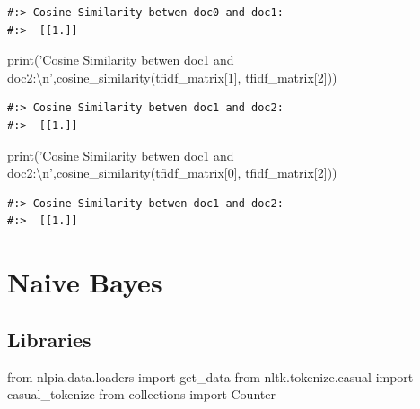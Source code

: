 \documentclass[
]{book}
\newenvironment{Shaded}{\begin{snugshade}}{\end{snugshade}}
\newcommand{\BuiltInTok}[1]{#1}
\newcommand{\CharTok}[1]{\textcolor[rgb]{0.5,0.5,0.5}{#1}}
\newcommand{\DecValTok}[1]{\textcolor[rgb]{0.06,0.06,0.06}{#1}}
\newcommand{\ImportTok}[1]{#1}
\newcommand{\NormalTok}[1]{#1}
\newcommand{\StringTok}[1]{\textcolor[rgb]{0.5,0.5,0.5}{#1}}
\begin{document}
\begin{verbatim}
#:> Cosine Similarity betwen doc0 and doc1:
#:>  [[1.]]
\end{verbatim}

\begin{Shaded}
\begin{Highlighting}[]
\BuiltInTok{print}\NormalTok{(}\StringTok{'Cosine Similarity betwen doc1 and doc2:}\CharTok{\textbackslash{}n}\StringTok{'}\NormalTok{,cosine_similarity(tfidf_matrix[}\DecValTok{1}\NormalTok{], tfidf_matrix[}\DecValTok{2}\NormalTok{]))}
\end{Highlighting}
\end{Shaded}

\begin{verbatim}
#:> Cosine Similarity betwen doc1 and doc2:
#:>  [[1.]]
\end{verbatim}

\begin{Shaded}
\begin{Highlighting}[]
\BuiltInTok{print}\NormalTok{(}\StringTok{'Cosine Similarity betwen doc1 and doc2:}\CharTok{\textbackslash{}n}\StringTok{'}\NormalTok{,cosine_similarity(tfidf_matrix[}\DecValTok{0}\NormalTok{], tfidf_matrix[}\DecValTok{2}\NormalTok{]))}
\end{Highlighting}
\end{Shaded}

\begin{verbatim}
#:> Cosine Similarity betwen doc1 and doc2:
#:>  [[1.]]
\end{verbatim}

\hypertarget{naive-bayes}{%
\section{Naive Bayes}\label{naive-bayes}}

\hypertarget{libraries}{%
\subsection{Libraries}\label{libraries}}

\begin{Shaded}
\begin{Highlighting}[]
\ImportTok{from}\NormalTok{ nlpia.data.loaders }\ImportTok{import}\NormalTok{ get_data}
\ImportTok{from}\NormalTok{ nltk.tokenize.casual     }\ImportTok{import}\NormalTok{ casual_tokenize}
\ImportTok{from}\NormalTok{ collections }\ImportTok{import}\NormalTok{ Counter}
\end{Highlighting}
\end{Shaded}
\end{document}
